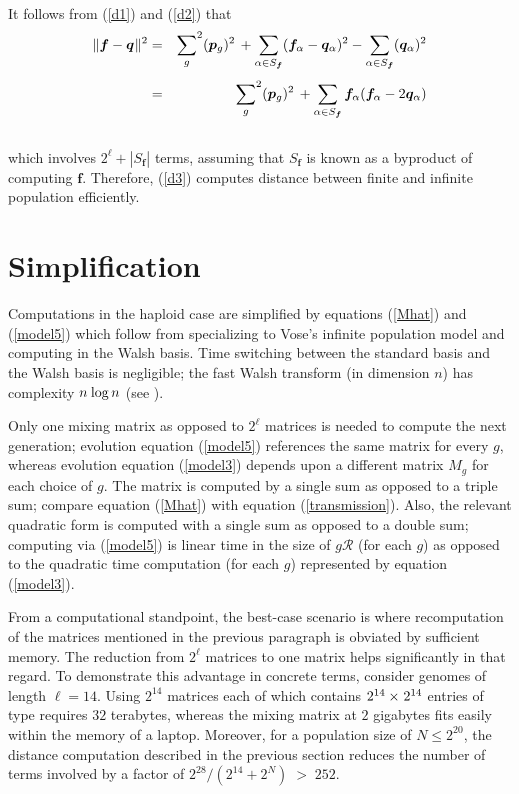 \mbox{ }\\[-.15in]
It follows from (\ref{d1}) and (\ref{d2}) that
\begin{eqnarray}
  \|{\bm f} - {\bm q} \hspace{0.005in} \|^2
  & = & 
      {\sum_{g}}^2 ({\bm p}_{g})^2 \, +
      \sum_{\alpha \in {S_{\bm f}}} ({\bm f}_\alpha-{\bm q}_\alpha)^2 -
      \sum_{\alpha \in {S_{\bm f}}} ( {\bm q}_{\alpha})^2
      \nonumber \\[0.05in]
      & = &
      {\sum_{g}}^2 ({\bm p}_{g})^2 \, +
      \sum_{\alpha \in {S_{\bm f}}} {\bm f}_\alpha ({\bm f}_\alpha- 2 {\bm q}_\alpha) \label{d3}
\end{eqnarray}
\mbox{ }\\[-.1in] which involves $2^\ell + |S_{\bm f}|$ terms,
assuming that  $S_{\bm f}$ is known as a byproduct of computing ${\bm f}$. Therefore, 
(\ref{d3}) computes distance between finite and infinite population efficiently.

\section{Simplification} 
Computations in the haploid case are simplified by equations (\ref{Mhat}) and (\ref{model5})
which follow from specializing to Vose's infinite population model and computing in the Walsh basis. 
Time switching between the standard basis and the Walsh basis is negligible; the fast Walsh transform 
(in dimension $n$) has complexity $n \hspace{0.01in} \log n$ (see \cite{Shanks1969}).

Only one mixing matrix as opposed to $2^\ell$ matrices is needed to compute the next generation; 
evolution equation (\ref{model5}) references the same matrix for every $g$, whereas 
evolution equation (\ref{model3}) depends upon a different matrix $M_g$ for each
choice of $g$. The matrix is computed by a single sum as opposed to a triple sum; 
compare equation (\ref{Mhat}) with equation (\ref{transmission}).  Also, the relevant quadratic 
form is computed with a single sum as opposed to a double sum; computing via (\ref{model5}) is 
linear time in the size of $g \mathcal{R}$ (for each $g$) as opposed to the quadratic time computation 
(for each $g$) represented by equation (\ref{model3}).

From a computational standpoint, the best-case scenario is where
recomputation of the matrices mentioned in the previous paragraph is
obviated by sufficient memory.  The reduction from $2^\ell$ matrices
to one matrix helps significantly in that regard. To demonstrate this
advantage in concrete terms, consider genomes of length $\ell = 14$.
Using $2^{14}$ matrices each of which contains $2^{14} \times \hspace{0.01in}
2^{14}$ entries of type \verb@double@ requires $32$ terabytes, whereas
the mixing matrix at $2$ gigabytes fits easily within the memory of a
laptop.  Moreover, for a population size of $N \le 2^{20}$, the
distance computation described in the previous section reduces the
number of terms involved by a factor of
$2^{28}/(2^{14} + 2^{N}) \; > \; 252$.

